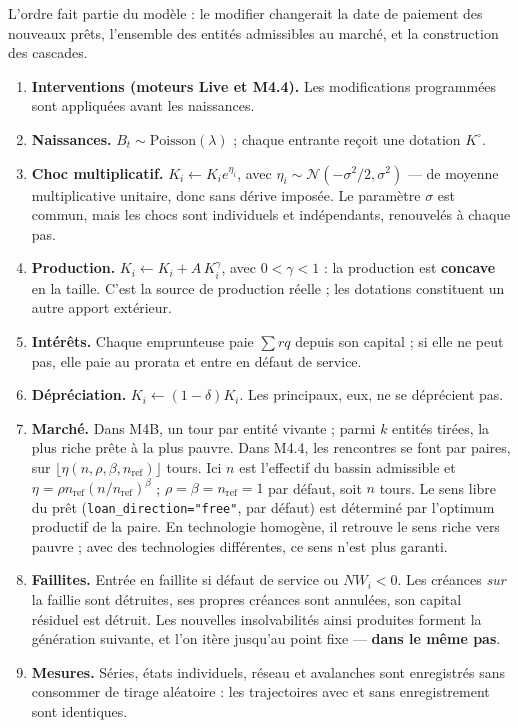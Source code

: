 \documentclass[11pt,a4paper]{article}
\newcommand{\code}[1]{\texttt{#1}}
\begin{document}
L'ordre fait partie du modèle : le modifier changerait la date de paiement des
nouveaux prêts, l'ensemble des entités admissibles au marché, et la
construction des cascades.

\begin{enumerate}
\item \textbf{Interventions (moteurs Live et M4.4).} Les modifications
      programmées sont appliquées avant les naissances.
\item \textbf{Naissances.} $B_t \sim \mathrm{Poisson}(\lambda)$ ; chaque
      entrante reçoit une dotation $K^\circ$.
\item \textbf{Choc multiplicatif.} $K_i \leftarrow K_i e^{\eta_i}$, avec
      $\eta_i \sim \mathcal{N}(-\sigma^2/2, \sigma^2)$ --- de moyenne
      multiplicative unitaire, donc sans dérive imposée. Le paramètre
      $\sigma$ est commun, mais les chocs sont individuels et indépendants,
      renouvelés à chaque pas.
\item \textbf{Production.} $K_i \leftarrow K_i + A\,K_i^{\gamma}$, avec
      $0 < \gamma < 1$ : la production est \textbf{concave} en la taille. C'est la
      source de production réelle ; les dotations constituent un autre apport extérieur.
\item \textbf{Intérêts.} Chaque emprunteuse paie $\sum r q$ depuis son
      capital ; si elle ne peut pas, elle paie au prorata et entre en défaut de
      service.
\item \textbf{Dépréciation.} $K_i \leftarrow (1-\delta) K_i$. Les principaux,
      eux, ne se déprécient pas.
\item \textbf{Marché.} Dans M4B, un tour par entité vivante ; parmi $k$
      entités tirées, la plus riche prête à la plus pauvre. Dans M4.4, les
      rencontres se font par paires, sur
      $\lfloor\eta(n,\rho,\beta,n_{\mathrm{ref}})\rfloor$ tours.
      Ici $n$ est l'effectif du bassin admissible et
      $\eta=\rho n_{\mathrm{ref}}(n/n_{\mathrm{ref}})^\beta$ ;
      $\rho=\beta=n_{\mathrm{ref}}=1$ par défaut, soit $n$ tours.
      Le sens libre du prêt (\code{loan\_direction="free"}, par défaut)
      est déterminé par l'optimum productif de la paire. En technologie
      homogène, il retrouve le sens riche vers pauvre ; avec des technologies
      différentes, ce sens n'est plus garanti.
\item \textbf{Faillites.} Entrée en faillite si défaut de service ou
      $NW_i < 0$. Les créances \emph{sur} la faillie sont détruites, ses
      propres créances sont annulées, son capital résiduel est détruit. Les
      nouvelles insolvabilités ainsi produites forment la génération suivante,
      et l'on itère jusqu'au point fixe --- \textbf{dans le même pas}.
\item \textbf{Mesures.} Séries, états individuels, réseau et avalanches sont
      enregistrés sans consommer de tirage aléatoire : les trajectoires avec et
      sans enregistrement sont identiques.
\end{enumerate}
\end{document}
